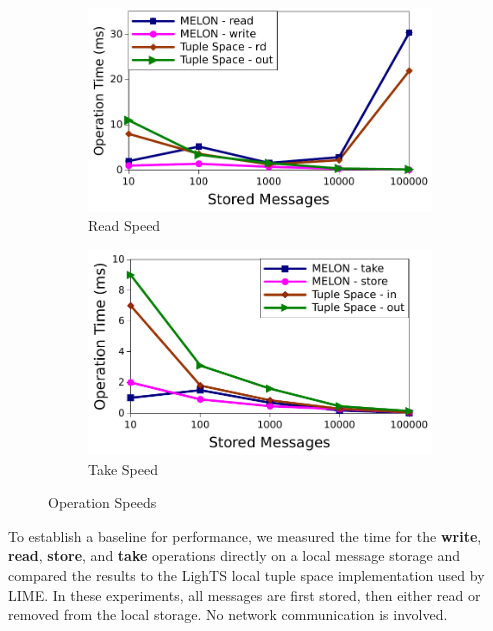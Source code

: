 \documentclass[lnicst]{svmultln}
\begin{document}
\begin{figure}
\centering

\begin{subfigure}{.5\textwidth}
\centering
\includegraphics[width = \linewidth, clip, trim = 0px 0px 0px 0px]{figures/read_speed.pdf}
\caption{Read Speed}
\label{fig:readspeed}
\end{subfigure}%
\begin{subfigure}{.5\textwidth}
\centering
\includegraphics[width = \linewidth, clip, trim = 0px 0px 0px 0px]{figures/in_speed.pdf}
\caption{Take Speed}
\label{fig:takespeed}
\end{subfigure}

\caption{Operation Speeds}
\end{figure}

To establish a baseline for performance, we measured the time for the \textbf{write}, \textbf{read}, \textbf{store}, and \textbf{take} operations directly on a local message storage and compared the results to the LighTS\cite{lights} local tuple space implementation used by LIME. In these experiments, all messages are first stored, then either read or removed from the local storage. No network communication is involved.
\end{document}
